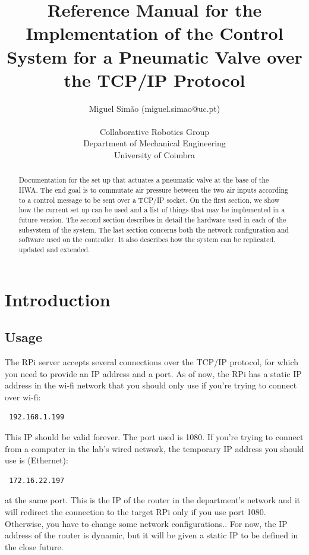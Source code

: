 \documentclass[twoside,a4paper]{refart}
\author{Miguel Sim\~ao (miguel.simao@uc.pt) \\
		\ \\
		Collaborative Robotics Group \\
		Department of Mechanical Engineering \\
		University of Coimbra}
\title{Reference Manual for the Implementation of the Control System for a Pneumatic Valve over the TCP/IP Protocol}
\date{}
\begin{document}
	
\maketitle


\begin{abstract}
	Documentation for the set up that actuates a pneumatic valve at the base of the IIWA. The end goal is to commutate air pressure between the two air inputs according to a control message to be sent over a TCP/IP socket. On the first section, we show how the current set up can be used and a list of things that may be implemented in a future version. The second section describes in detail the hardware used in each of the subsystem of the system. The last section concerns both the network configuration and software used on the controller. It also describes how the system can be replicated, updated and extended.
\end{abstract}

\tableofcontents

\newpage





\section{Introduction}
\subsection{Usage}
The RPi server accepts several connections over the TCP/IP protocol, for which you need to provide an IP address and a port. As of now, the RPi has a static IP address in the wi-fi network that you should only use if you're trying to connect over wi-fi:
\begin{verbatim} 192.168.1.199 \end{verbatim}
This IP should be valid forever. The port used is 1080. If you're trying to connect from a computer in the lab's wired network, the temporary IP address you should use is (Ethernet):
\begin{verbatim} 172.16.22.197 \end{verbatim}
at the same port. This is the IP of the router in the department's network and it will redirect the connection to the target RPi only if you use port 1080. Otherwise, you have to change some network configurations.. \attention For now, the IP address of the router is dynamic, but it will be given a static IP to be defined in the close future.
\end{document}
